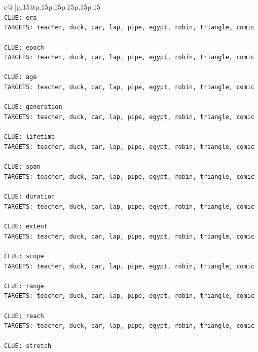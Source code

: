 \documentclass{article}
\begin{document}
{\begin{supertabular}{c@{$\;$}|p{.15\linewidth}@{}p{.15\linewidth}p{.15\linewidth}p{.15\linewidth}p{.15\linewidth}p{.15\linewidth}}
{{{\\ 
\texttt{CLUE: era} \\
\texttt{TARGETS: teacher, duck, car, lap, pipe, egypt, robin, triangle, comic} \\
\\ 
\texttt{CLUE: epoch} \\
\texttt{TARGETS: teacher, duck, car, lap, pipe, egypt, robin, triangle, comic} \\
\\ 
\texttt{CLUE: age} \\
\texttt{TARGETS: teacher, duck, car, lap, pipe, egypt, robin, triangle, comic} \\
\\ 
\texttt{CLUE: generation} \\
\texttt{TARGETS: teacher, duck, car, lap, pipe, egypt, robin, triangle, comic} \\
\\ 
\texttt{CLUE: lifetime} \\
\texttt{TARGETS: teacher, duck, car, lap, pipe, egypt, robin, triangle, comic} \\
\\ 
\texttt{CLUE: span} \\
\texttt{TARGETS: teacher, duck, car, lap, pipe, egypt, robin, triangle, comic} \\
\\ 
\texttt{CLUE: duration} \\
\texttt{TARGETS: teacher, duck, car, lap, pipe, egypt, robin, triangle, comic} \\
\\ 
\texttt{CLUE: extent} \\
\texttt{TARGETS: teacher, duck, car, lap, pipe, egypt, robin, triangle, comic} \\
\\ 
\texttt{CLUE: scope} \\
\texttt{TARGETS: teacher, duck, car, lap, pipe, egypt, robin, triangle, comic} \\
\\ 
\texttt{CLUE: range} \\
\texttt{TARGETS: teacher, duck, car, lap, pipe, egypt, robin, triangle, comic} \\
\\ 
\texttt{CLUE: reach} \\
\texttt{TARGETS: teacher, duck, car, lap, pipe, egypt, robin, triangle, comic} \\
\\ 
\texttt{CLUE: stretch} \\
}}}
\end{supertabular}}
\end{document}

